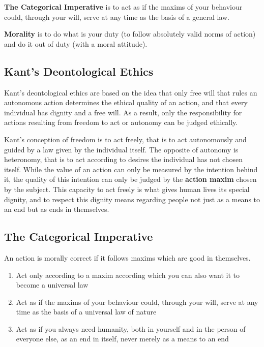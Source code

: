 \documentclass[11pt]{article}
\theoremstyle{definition}
\begin{document}
\begin{definition}
	\textbf{The Categorical Imperative} is to act as if the maxims of your behaviour could, through your will, serve at any time as the basis of a general law. \parencite{kant1870grundlegung}
\end{definition}

\begin{definition}
	\textbf{Morality} is to do what is your duty (to follow absolutely valid norms of action) and do it out of duty (with a moral attitude).
\end{definition}

\subsection{Kant's Deontological Ethics}
Kant's deontological ethics are based on the idea that only free will that rules an autonomous action determines the ethical quality of an action, and that every individual has dignity and a free will. As a result, only the responsibility for actions resulting from freedom to act or autonomy can be judged ethically.

Kant's conception of freedom is to act freely, that is to act autonomously and guided by a law given by the individual itself. The opposite of autonomy is heteronomy, that is to act according to desires the individual has not chosen itself. While the value of an action can only be measured by the intention behind it, the quality of this intention can only be judged by the \textbf{action maxim} chosen by the subject. This capacity to act freely is what gives human lives its special dignity, and to respect this dignity means regarding people not just as a means to an end but as ends in themselves.

\subsection{The Categorical Imperative}
An action is morally correct if it follows maxims which are good in themselves.
\begin{enumerate}
	\item Act only according to a maxim according which you can also want it to become a universal law
	\item Act as if the maxims of your behaviour could, through your will, serve at any time as the basis of a universal law of nature
	\item Act as if you always need humanity, both in yourself and in the person of everyone else, as an end in itself, never merely as a means to an end
\end{enumerate}
\end{document}
